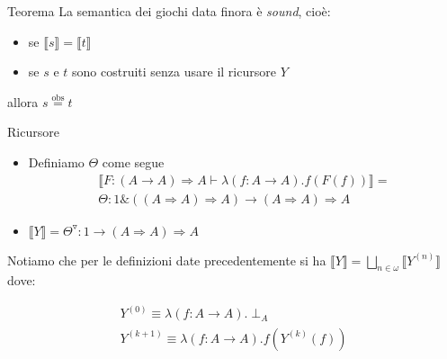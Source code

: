 \documentclass{beamer}
\newcommand{\eqobs}{\stackrel{\text{obs}}{=}}
\begin{document}
\begin{frame}
	
	\begin{block}{Teorema}
		La semantica dei giochi data finora è \emph{sound}, cioè:
		\begin{itemize}
			\item se $\llbracket s \rrbracket = 
	\llbracket t \rrbracket$
			\item se $s$ e $t$ sono costruiti senza usare il ricursore $Y$
		\end{itemize}
  allora $s \eqobs t$
	\end{block}

	
\end{frame}









\begin{frame}
	
	\begin{block}{Ricursore}
	
		\begin{itemize}
			\item Definiamo $\Theta$ come segue
			\begin{gather*}
				\llbracket F: (A \rightarrow A) \Rightarrow A \vdash \lambda (f : A \rightarrow A).f(F(f)) \rrbracket = \\
				\Theta:1\&((A\Rightarrow A) \Rightarrow A) \rightarrow (A\Rightarrow A) \Rightarrow A
			\end{gather*}
			\item $\llbracket Y \rrbracket = \Theta ^\triangledown : 1 \rightarrow (A\Rightarrow A) \Rightarrow A$
		\end{itemize}
		
	\end{block}
	
	Notiamo che per le definizioni date precedentemente si ha $\llbracket Y \rrbracket = \bigsqcup_{n\in \omega} \llbracket Y^{(n)} \rrbracket$ dove:
	
	\begin{gather*}
		Y^{(0)} \equiv \lambda(f: A \rightarrow A).\perp_A \\
		Y^{(k+1)} \equiv \lambda(f : A\rightarrow A).f(Y^{(k)}(f))
	\end{gather*}


	
\end{frame}
\end{document}
